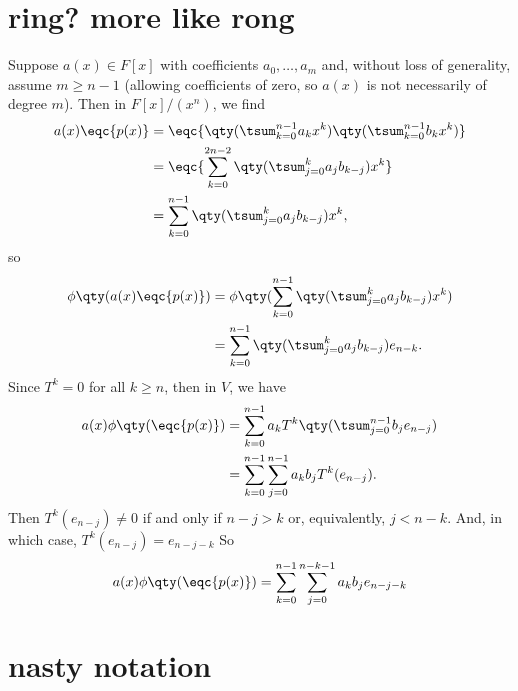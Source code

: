 \documentclass[12pt]{article}
\begin{document}
\section{ring? more like rong}

Suppose $a(x) \in F[x]$ with coefficients $a_0, \dots, a_m$ and, without loss of generality, assume $m \geq n-1$ (allowing coefficients of zero, so $a(x)$ is not necessarily of degree $m$). Then in $F[x]/(x^n)$, we find
    \begin{align*}
        a(x)\eqc{p(x)}
            &= \eqc{\qty(\tsum_{k=0}^{n-1} a_{k} x^k)\qty(\tsum_{k=0}^{n-1} b_k x^k)} \\
            &= \eqc{\sum_{k=0}^{2n-2} \qty(\tsum_{j=0}^{k} a_j b_{k-j})x^k} \\
            &= \sum_{k=0}^{n-1} \qty(\tsum_{j=0}^{k} a_j b_{k-j})x^k,
    \end{align*}
    so
    \begin{align*}
        \phi\qty(a(x)\eqc{p(x)})
            &= \phi\qty(\sum_{k=0}^{n-1} \qty(\tsum_{j=0}^{k} a_j b_{k-j})x^k) \\
            &= \sum_{k=0}^{n-1} \qty(\tsum_{j=0}^{k} a_j b_{k-j}) e_{n-k}.
    \end{align*}
    Since $T^k = 0$ for all $k \geq n$, then in $V$, we have
    \begin{align*}
        a(x)\phi\qty(\eqc{p(x)})
            &= \sum_{k=0}^{n-1} a_k T^k\qty(\tsum_{j=0}^{n-1}b_j e_{n-j}) \\
            &= \sum_{k=0}^{n-1} \sum_{j=0}^{n-1} a_k b_j T^k(e_{n-j}).
    \end{align*}
    Then $T^k(e_{n-j}) \ne 0$ if and only if $n-j > k$ or, equivalently, $j < n-k$. And, in which case, $T^k(e_{n-j}) = e_{n-j-k}$ So
    \begin{align*}
        a(x)\phi\qty(\eqc{p(x)})
            &= \sum_{k=0}^{n-1} \sum_{j=0}^{n-k-1} a_k b_j e_{n-j-k} \\
    \end{align*}

\section{nasty notation}
\end{document}

